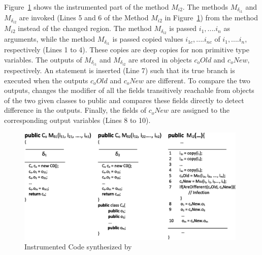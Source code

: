 Figure~\ref{fig:instrumented} shows the instrumented part of the method $M_{i2}$. 
The methods $M_{\delta_{i1}}$ and $M_{\delta_{i2}}$ are invoked (Lines 5 and 6 of the Method $M_{i2}$ in Figure~\ref{fig:instrumented}) from the method $M_{i2}$ instead of the changed region.
The method $M_{\delta_{i2}}$ is passed $i_1,....i_n$ as arguments, while the method $M_{\delta_{i1}}$
is passed copied values $i_{1c},....i_{nc}$ of $i_1,....i_n$, respectively (Lines 1 to 4). These copies are deep copies for non primitive type variables.
The outputs of $M_{\delta_{i1}}$ and $M_{\delta_{i2}}$ are stored in objects $c_{o}Old$ and $c_{o}New$, respectively.
An  statement is inserted (Line 7) such that its true branch is executed when the outputs 
$c_{o}Old$ and $c_{o}New$ are different.    
To compare the two outputs,  changes the modifier 
of all the fields transitively reachable from objects of the
two given classes to public and compares these fields directly to detect difference in the outputs.
Finally, the fields of $c_{o}New$ are assigned to the corresponding output variables (Lines 8 to 10).



\begin{figure}[t]
\hspace{0.5cm}
	\includegraphics[width=11cm, keepaspectratio]{Figures/instrumentation}
  
\vspace{-0.15 in}
\caption{Instrumented Code synthesized by }
\label{fig:instrumented}
\vspace{-0.25 in}
\end{figure}


